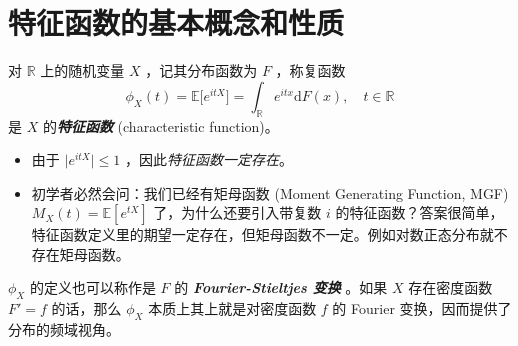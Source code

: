 \section{特征函数的基本概念和性质}
\begin{definition}
  
对 $\mathbb R$ 上的随机变量 $X$ ，记其分布函数为 $F$ ，称复函数\[\phi_X(t)=\mathbb{E}\big[e^{itX}\big]=\int_{\mathbb R} e^{it x}\mathrm{d}F(x),\quad t\in\mathbb R\]
是 $X$ 的\textbf{\emph{特征函数}} (characteristic function)。
\end{definition}
\begin{remark}
  \begin{itemize}\tightlist
    \item 
由于 $\big|e^{it X}\big|\le 1$ ，因此\emph{特征函数一定存在}。
    \item 
    初学者必然会问：我们已经有矩母函数 (Moment Generating Function, MGF) $M_X(t) = \mathbb{E}[e^{tX}]$ 了，为什么还要引入带复数 $i$ 的特征函数？答案很简单，特征函数定义里的期望一定存在，但矩母函数不一定。例如对数正态分布就不存在矩母函数。

  \end{itemize}
\end{remark}

$\phi_X$ 的定义也可以称作是 $F$ 的 \textbf{\emph{Fourier-Stieltjes 变换}} 。如果 $X$ 存在密度函数 $F'=f$ 的话，那么 $\phi_X$ 本质上其上就是对密度函数 $f$ 的 Fourier 变换，因而提供了分布的频域视角。

